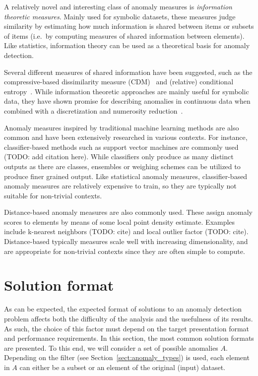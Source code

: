 A relatively novel and interesting class of anomaly measures is \emph{information theoretic measures}. Mainly used for symbolic datasets, these measures judge similarity by estimating how much information is shared between items or subsets of items (i.e.\ by computing measures of shared information between elements). Like statistics, information theory can be used as a theoretical basis for anomaly detection.

Several different measures of shared information have been suggested, such as the compressive-based dissimilarity measure (CDM)~\cite{keogh2} and (relative) conditional entropy~\cite{xiang}. While information theoretic approaches are mainly useful for symbolic data, they have shown promise for describing anomalies in continuous data when combined with a discretization and numerosity reduction~\cite{keogh2}.

Anomaly measures inspired by traditional machine learning methods are also common and have been extensively researched in various contexts. For instance, classifier-based methods such as support vector machines are commonly used (TODO: add citation here). While classifiers only produce as many distinct outputs as there are classes, ensembles or weighing schemes can be utilized to produce finer grained output. Like statistical anomaly measures, classifier-based anomaly measures are relatively expensive to train, so they are typically not suitable for non-trivial contexts.

Distance-based anomaly measures are also commonly used. These assign anomaly scores to elements by means of some local point density estimate. Examples include k-nearest neighbors (TODO: cite) and local outlier factor (TODO: cite). Distance-based typically measures scale well with increasing dimensionality, and are appropriate for non-trivial contexts since they are often simple to compute.

\section{Solution format}
\label{sect:output_format}

As can be expected, the expected format of solutions to an anomaly detection problem affects both the difficulty of the analysis and the usefulness of its results. As such, the choice of this factor must depend on the target presentation format and performance requirements. In this section, the most common solution formats are presented. To this end, we will consider a set of possible anomalies $A$. Depending on the filter (see Section~\ref{sect:anomaly_types}) is used, each element in $A$ can either be a subset or an element of the original (input) dataset.

